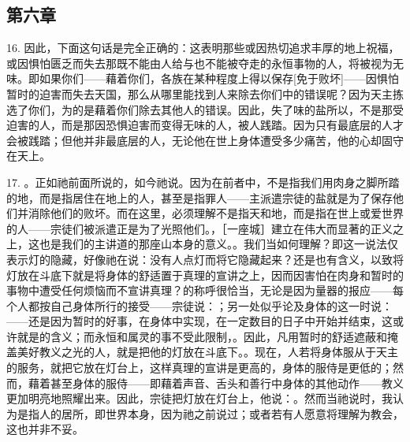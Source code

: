 
\subsection{第六章}

16. 因此，下面这句话是完全正确的：这表明那些或因热切追求丰厚的地上祝福，或因惧怕匮乏而失去那既不能由人给与也不能被夺走的永恒事物的人，将被视为无味。即如果你们——藉着你们，各族在某种程度上得以保存[免于败坏]——因惧怕暂时的迫害而失去天国，那么从哪里能找到人来除去你们中的错误呢？因为天主拣选了你们，为的是藉着你们除去其他人的错误。因此，失了味的盐所以，不是那受迫害的人，而是那因恐惧迫害而变得无味的人，被人践踏。因为只有最底层的人才会被践踏；但他并非最底层的人，无论他在世上身体遭受多少痛苦，他的心却固守在天上。\par

17. 。正如祂前面所说的，如今祂说。因为在前者中，不是指我们用肉身之脚所踏的地，而是指居住在地上的人，甚至是指罪人——主派遣宗徒的盐就是为了保存他们并消除他们的败坏。而在这里，必须理解不是指天和地，而是指在世上或爱世界的人——宗徒们被派遣正是为了光照他们。，［一座城］建立在伟大而显著的正义之上，这也是我们的主讲道的那座山本身的意义。。我们当如何理解？即这一说法仅表示灯的隐藏，好像祂在说：没有人点灯而将它隐藏起来？还是也有含义，以致将灯放在斗底下就是将身体的舒适置于真理的宣讲之上，因而因害怕在肉身和暂时的事物中遭受任何烦恼而不宣讲真理？的称呼很恰当，无论是因为量器的报应——每个人都按自己身体所行的接受——宗徒说：；另一处似乎论及身体的这一时说：——还是因为暂时的好事，在身体中实现，在一定数目的日子中开始并结束，这或许就是的含义；而永恒和属灵的事不受此限制，。因此，凡用暂时的舒适遮蔽和掩盖美好教义之光的人，就是把他的灯放在斗底下。。现在，人若将身体服从于天主的服务，就把它放在灯台上，这样真理的宣讲是更高的，身体的服侍是更低的；然而，藉着甚至身体的服侍——即藉着声音、舌头和善行中身体的其他动作——教义更加明亮地照耀出来。因此，宗徒把灯放在灯台上，他说：。然而当祂说时，我认为是指人的居所，即世界本身，因为祂之前说过；或者若有人愿意将理解为教会，这也并非不妥。\par

